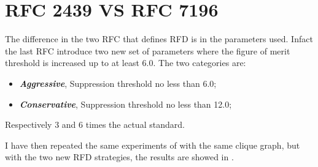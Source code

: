 
\section{RFC 2439 VS RFC 7196}
\label{sec:bgp_rfd_comparison}

The difference in the two \ac{RFC} that defines \ac{RFD} \cite{rfc2439,rfc7196}
is in the parameters used.
Infact the last \ac{RFC} introduce two new set of parameters where the figure
of merit threshold is increased up to at least \num{6.0}.
The two categories are:
\begin{itemize}
	\item \textit{\textbf{Aggressive}}, Suppression threshold no less than \num{6.0};
	\item \textit{\textbf{Conservative}}, Suppression threshold no less than \num{12.0};
\end{itemize}

Respectively \num{3} and \num{6} times the actual standard.

I have then repeated the same experiments of  with the same
clique graph, but with the two new \ac{RFD} strategies, the results are 
showed in .

